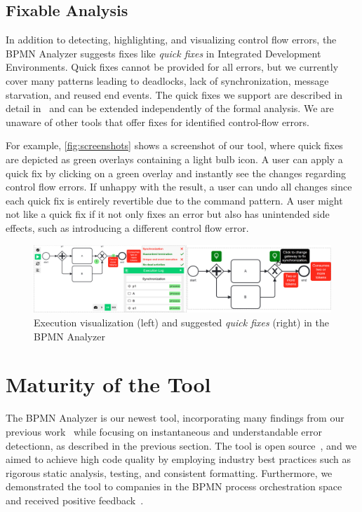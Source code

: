 \documentclass[
onecolumn, %
]{ceurart}
\begin{document}
\subsection{Fixable Analysis}
In addition to detecting, highlighting, and visualizing control flow errors, the BPMN Analyzer suggests fixes like \textit{quick fixes} in Integrated Development Environments.
Quick fixes cannot be provided for all errors, but we currently cover many patterns leading to deadlocks, lack of synchronization, message starvation, and reused end events.
The quick fixes we support are described in detail in~\cite{krauterInstantaneousComprehensibleFixable2024} and can be extended independently of the formal analysis.
We are unaware of other tools that offer fixes for identified control-flow errors.

For example, \autoref{fig:screenshots} shows a screenshot of our tool, where quick fixes are depicted as green overlays containing a light bulb icon.
A user can apply a quick fix by clicking on a green overlay and instantly see the changes regarding control flow errors.
If unhappy with the result, a user can undo all changes since each quick fix is entirely revertible due to the command pattern.
A user might not like a quick fix if it not only fixes an error but also has unintended side effects, such as introducing a different control flow error.

\begin{figure}[ht]
	\centering
	\includegraphics[width=0.8\linewidth]{images/tool-screenshots}
	\caption{Execution visualization (left) and suggested \textit{quick fixes} (right) in the BPMN Analyzer}
	\label{fig:screenshots}
\end{figure}

\section{Maturity of the Tool} \label{sec:maturity}
The BPMN Analyzer is our newest tool, incorporating many findings from our previous work~\cite{krauterHigherorderTransformationApproach2024} while focusing on instantaneous and understandable error detectionn, as described in the previous section.
The tool is open source~\cite{krauterInstantaneousComprehensibleFixable2024}, and we aimed to achieve high code quality by employing industry best practices such as rigorous static analysis, testing, and consistent formatting.
Furthermore, we demonstrated the tool to companies in the BPMN process orchestration space and received positive feedback~\cite{krauterInstantaneousComprehensibleFixable2024}.
\end{document}
